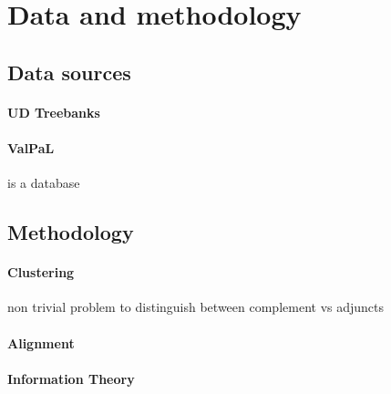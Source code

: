 \section{Data and methodology}

\subsection{Data sources}

\paragraph{\textbf{UD Treebanks}} \cite{universaldep}
\paragraph{\textbf{ValPaL}} \citep{valpal} is a database


\subsection{Methodology}


\paragraph{Clustering}

non trivial problem to distinguish between complement vs adjuncts

\paragraph{Alignment}
\paragraph{Information Theory}